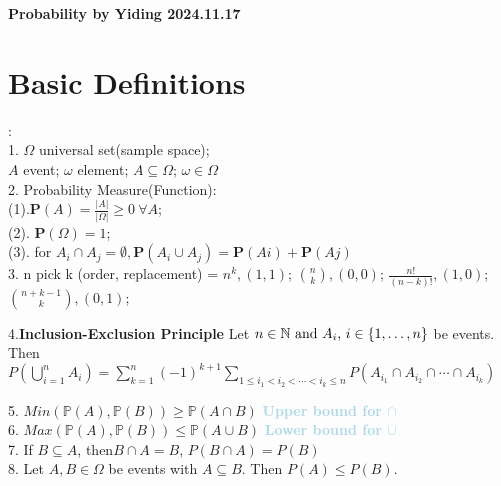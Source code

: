 \documentclass[twocolumn]{article}
\newcommand{\method}[1]{\textbf{\textcolor{lightblue}{#1}}}
\newcommand{\sectionspace}{\vspace*{1em}}
\begin{document}
\thispagestyle{empty}
\RaggedRight
\begin{center}
  {\large\color{headcolor}\textbf{Probability by Yiding 2024.11.17}}  \\
\end{center}

\section{Basic Definitions}
:\\
1. $\Omega$ universal set(sample space);\\
 $A$ event; $\omega$ element; $ A \subseteq  \Omega $; $ \omega \in \Omega$ \\
2. Probability Measure(Function): \\
(1).$\mathbf{P}(A) = \frac{|A|}{|\Omega|} \geq 0 \ \forall A$; \\
(2). $\mathbf{P}(\Omega) = 1$;\\
(3). for $ A_i \cap A_j = \emptyset, \mathbf{P}(A_i \cup A_j) = \mathbf{P}(Ai) + \mathbf{P}(Aj)$\\
3. n pick k (order,  replacement) = $n^k,(1,1)$; $\binom{n}{k}, (0, 0)$; $\frac{n!}{(n-k)!}, (1,0)$; $\binom{n+k-1}{k}, (0, 1)$; \\
\sectionspace

4.\textbf{Inclusion-Exclusion Principle} Let $ n \in \mathbb{N} \) and \( A_i \), \( i \in \{1, \ldots, n\} $ be events. Then$P\left(\bigcup_{i=1}^n A_i\right) = \sum_{k=1}^n (-1)^{k+1} \sum_{1 \leq i_1 < i_2 < \cdots < i_k \leq n} P\left(A_{i_1} \cap A_{i_2} \cap \cdots \cap A_{i_k}\right) $\\
\sectionspace

5. $ Min(\mathbb{P}(A), \mathbb{P}(B)) \geq \mathbb{P}(A \cap B)$  \method{Upper bound for $\cap$}\\
6. $ Max(\mathbb{P}(A), \mathbb{P}(B)) \leq \mathbb{P}(A \cup B)$ \method{Lower bound for $\cup$}\\
7. If $B \subseteq A$, then$ B \cap A = B$, $P(B  \cap A) = P(B) $\\
8. Let \( A, B \in \Omega \) be events with \( A \subseteq B \). Then \( P(A) \leq P(B) \).


\sectionspace
\end{document}
